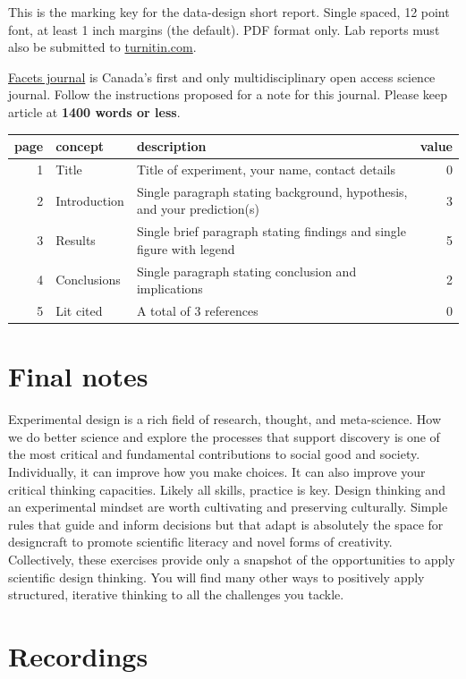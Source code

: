 \documentclass[
]{book}
\begin{document}
This is the marking key for the data-design short report. Single spaced, 12 point font, at least 1 inch margins (the default). PDF format only. Lab reports must also be submitted to \href{https://www.turnitin.com}{turnitin.com}.

\href{https://www.facetsjournal.com/for-authors/instructions-to-authors}{Facets journal} is Canada's first and only multidisciplinary open access science journal. Follow the instructions proposed for a note for this journal. Please keep article at \textbf{1400 words or less}.

\begin{tabular}{rllr}
\toprule
page & concept & description & value\\
\midrule
1 & Title & Title of experiment, your name, contact details & 0\\
2 & Introduction & Single paragraph stating background, hypothesis, and your prediction(s) & 3\\
3 & Results & Single brief paragraph stating findings and single figure with legend & 5\\
4 & Conclusions & Single paragraph stating conclusion and implications & 2\\
5 & Lit cited & A total of 3 references & 0\\
\bottomrule
\end{tabular}

\hypertarget{notes}{%
\chapter{Final notes}\label{notes}}

Experimental design is a rich field of research, thought, and meta-science. How we do better science and explore the processes that support discovery is one of the most critical and fundamental contributions to social good and society. Individually, it can improve how you make choices. It can also improve your critical thinking capacities. Likely all skills, practice is key. Design thinking and an experimental mindset are worth cultivating and preserving culturally. Simple rules that guide and inform decisions but that adapt is absolutely the space for designcraft to promote scientific literacy and novel forms of creativity. Collectively, these exercises provide only a snapshot of the opportunities to apply scientific design thinking. You will find many other ways to positively apply structured, iterative thinking to all the challenges you tackle.

\hypertarget{recordings}{%
\chapter{Recordings}\label{recordings}}
\end{document}
